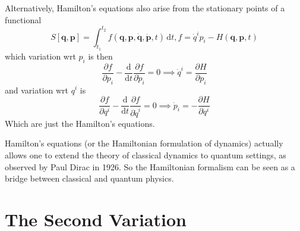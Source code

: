 \documentclass{article}
\begin{document}
Alternatively, Hamilton's equations also arise from the stationary points of a functional
$$S[\mathbf{q},\mathbf{p}]=\int_{t_1}^{t_2}f(\mathbf{q},\mathbf{p},\mathbf{\dot{q}},\mathbf{\dot{p}},t)\,\mathrm dt,f=\dot{q}^ip_i-H(\mathbf{q},\mathbf{p},t)$$
which variation wrt $p_i$ is then
$$\frac{\partial f}{\partial p_i}-\frac{\mathrm d}{\mathrm dt}\frac{\partial f}{\partial \dot{p}_i}=0\implies \dot{q}^i=\frac{\partial H}{\partial p_i}$$
and variation wrt $q^i$ is
$$\frac{\partial f}{\partial q^i}-\frac{\mathrm d}{\mathrm dt}\frac{\partial f}{\partial \dot{q}^i}=0\implies \dot{p}_i=-\frac{\partial H}{\partial q^i}$$
Which are just the Hamilton's equations.

Hamilton's equations (or the Hamiltonian formulation of dynamics) actually allows one to extend the theory of classical dynamics to quantum settings, as observed by Paul Dirac in 1926.
So the Hamiltonian formalism can be seen as a bridge between classical and quantum physics.
\newpage


\section{The Second Variation}
\end{document}
